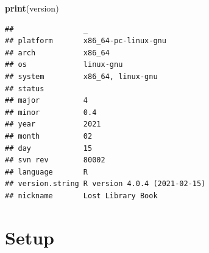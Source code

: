 \documentclass[]{book}
\newenvironment{Shaded}{\begin{snugshade}}{\end{snugshade}}
\newcommand{\KeywordTok}[1]{\textcolor[rgb]{0.13,0.29,0.53}{\textbf{#1}}}
\newcommand{\NormalTok}[1]{#1}
\begin{document}
\begin{Shaded}
\begin{Highlighting}[]
\KeywordTok{print}\NormalTok{(version)}
\end{Highlighting}
\end{Shaded}

\begin{verbatim}
##                _                           
## platform       x86_64-pc-linux-gnu         
## arch           x86_64                      
## os             linux-gnu                   
## system         x86_64, linux-gnu           
## status                                     
## major          4                           
## minor          0.4                         
## year           2021                        
## month          02                          
## day            15                          
## svn rev        80002                       
## language       R                           
## version.string R version 4.0.4 (2021-02-15)
## nickname       Lost Library Book
\end{verbatim}

\hypertarget{setup}{%
\section{Setup}\label{setup}}
\end{document}
